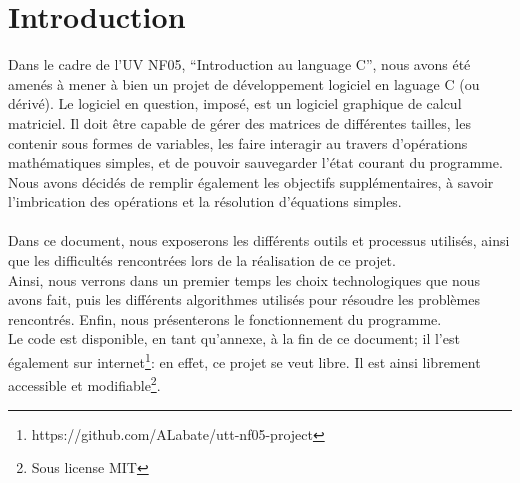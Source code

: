 \chapter{Introduction}
        Dans le cadre de l'UV NF05, ``Introduction au language C'', nous avons été amenés à mener à bien un projet de développement logiciel en laguage C (ou dérivé).
    Le logiciel en question, imposé, est un logiciel graphique de calcul matriciel. Il doit être capable de gérer des matrices de différentes tailles,
    les contenir sous formes de variables, les faire interagir au travers d'opérations mathématiques simples, et de pouvoir sauvegarder l'état courant du programme.
    Nous avons décidés de remplir également les objectifs supplémentaires, à savoir l'imbrication des opérations et la résolution d'équations simples.
    \\\\
    Dans ce document, nous exposerons les différents outils et processus utilisés, ainsi que les difficultés rencontrées lors de la réalisation de ce
    projet.\\ 
    Ainsi, nous verrons dans un premier temps les choix technologiques que nous avons fait, puis les différents algorithmes utilisés pour résoudre
    les problèmes rencontrés. Enfin, nous présenterons le fonctionnement du programme.\\
    Le code est disponible, en tant qu'annexe, à la fin de ce document; il l'est également sur internet\footnote{https://github.com/ALabate/utt-nf05-project}: en effet, ce projet se veut libre. Il est ainsi librement accessible et modifiable\footnote{Sous license MIT}.